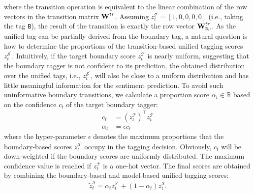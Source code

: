 \documentclass[letterpaper]{article} %
\begin{document}
where the transition operation is equivalent to the linear combination of the row vectors in the transition matrix $\text{\bf W}^{tr}$. Assuming $z^{\mathcal{T}}_t=[1,0,0,0,0]$ (i.e., taking the tag \texttt{B}), the result of the transition is exactly the row vector $\text{\bf W}^{tr}_{\texttt{B},:}$. As the unified tag can be partially derived from the boundary tag, a natural question is how to determine the proportions of the transition-based unified tagging scores $z^{\mathcal{S}^{'}}_t$. Intuitively, if the target boundary score $z^{\mathcal{T}}_t$ is nearly uniform, suggesting that the boundary tagger is not confident to its prediction, the obtained distribution over the unified tags, i.e., $z^{\mathcal{S}^{'}}_t$, will also be close to a uniform distribution and has little meaningful information for the sentiment prediction. To avoid such uninformative boundary transitions, we calculate a proportion score $\alpha_t \in \mathbb{R}$ based on the confidence $c_t$ of the target boundary tagger:
\begin{equation}
\begin{split}
    c_t &= (z^{\mathcal{T}}_t)^{\top} z^{\mathcal{T}}_t \\
    \alpha_t &= \epsilon c_t
\end{split}
\end{equation}
where the hyper-parameter $\epsilon$ denotes the maximum proportions that the boundary-based scores $z^{\mathcal{S}^{'}}_t$ occupy in the tagging decision. Obviously, $c_t$ will be down-weighted if the boundary scores are uniformly distributed. The maximum confidence value is reached if $z^{\mathcal{T}}_t$ is a one-hot vector. The final scores are obtained by combining the boundary-based and model-based unified tagging scores:
\begin{equation}
    \tilde{z}^{\mathcal{S}}_t = \alpha_t z^{\mathcal{S}^{'}}_t + (1-\alpha_t) z^{\mathcal{S}}_t.
\end{equation}
\end{document}
